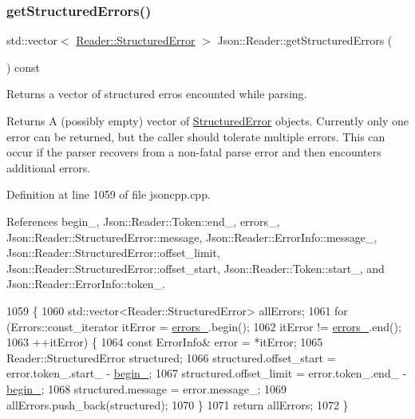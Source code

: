 \subsubsection{\texorpdfstring{get\+Structured\+Errors()}{getStructuredErrors()}}
{\footnotesize\ttfamily std\+::vector$<$ \hyperlink{struct_json_1_1_reader_1_1_structured_error}{Reader\+::\+Structured\+Error} $>$ Json\+::\+Reader\+::get\+Structured\+Errors (\begin{DoxyParamCaption}{ }\end{DoxyParamCaption}) const}



Returns a vector of structured erros encounted while parsing. 

\begin{DoxyReturn}{Returns}
A (possibly empty) vector of \hyperlink{struct_json_1_1_reader_1_1_structured_error}{Structured\+Error} objects. Currently only one error can be returned, but the caller should tolerate multiple errors. This can occur if the parser recovers from a non-\/fatal parse error and then encounters additional errors. 
\end{DoxyReturn}


Definition at line 1059 of file jsoncpp.\+cpp.



References begin\+\_\+, Json\+::\+Reader\+::\+Token\+::end\+\_\+, errors\+\_\+, Json\+::\+Reader\+::\+Structured\+Error\+::message, Json\+::\+Reader\+::\+Error\+Info\+::message\+\_\+, Json\+::\+Reader\+::\+Structured\+Error\+::offset\+\_\+limit, Json\+::\+Reader\+::\+Structured\+Error\+::offset\+\_\+start, Json\+::\+Reader\+::\+Token\+::start\+\_\+, and Json\+::\+Reader\+::\+Error\+Info\+::token\+\_\+.


\begin{DoxyCode}
1059                                                                    \{
1060   std::vector<Reader::StructuredError> allErrors;
1061   \textcolor{keywordflow}{for} (Errors::const\_iterator itError = \hyperlink{class_json_1_1_reader_a1bbce45dc4df753bed60c129f4b5147c}{errors\_}.begin();
1062        itError != \hyperlink{class_json_1_1_reader_a1bbce45dc4df753bed60c129f4b5147c}{errors\_}.end();
1063        ++itError) \{
1064     \textcolor{keyword}{const} ErrorInfo& error = *itError;
1065     Reader::StructuredError structured;
1066     structured.offset\_start = error.token\_.start\_ - \hyperlink{class_json_1_1_reader_a327166839022ea91f0a8290960a8af76}{begin\_};
1067     structured.offset\_limit = error.token\_.end\_ - \hyperlink{class_json_1_1_reader_a327166839022ea91f0a8290960a8af76}{begin\_};
1068     structured.message = error.message\_;
1069     allErrors.push\_back(structured);
1070   \}
1071   \textcolor{keywordflow}{return} allErrors;
1072 \}
\end{DoxyCode}
\mbox{\label{class_json_1_1_reader_a86cbb42b3e6d4a4d6416473b1a8f6ae7}} 
